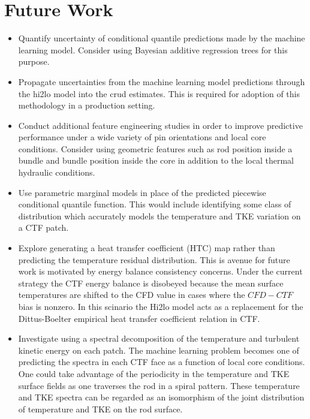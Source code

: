 \section{Future Work}

\begin{itemize}
    
    \item Quantify uncertainty of conditional quantile predictions made by the machine learning model.  Consider using Bayesian additive regression trees for this purpose.
    
    \item Propagate uncertainties from the machine learning model predictions through the hi2lo model into the crud estimates.  This is required for adoption of this methodology in a production setting.
    
    \item Conduct additional feature engineering studies in order to improve predictive performance under a wide variety of pin orientations and local core conditions.  Consider using geometric features such as rod position inside a bundle and bundle position inside the core in addition to the local thermal hydraulic conditions.
	
	\item Use parametric marginal models in place of the predicted piecewise conditional quantile function.  This would include identifying some class of distribution which accurately models the temperature and TKE variation on a CTF patch.
	
	\item Explore generating a heat transfer coefficient (HTC) map rather than predicting the temperature residual distribution.  This is avenue for future work is motivated by energy balance consistency concerns.  Under the current strategy the CTF energy balance is disobeyed because the mean surface temperatures are shifted to the CFD value in cases where the $CFD-CTF$ bias is nonzero.  In this scinario the Hi2lo model acts as a replacement for the Dittus-Boelter empirical heat transfer coefficient relation in CTF.
	
	\item Investigate using a spectral decomposition of the temperature and turbulent kinetic energy on each patch.  The machine learning problem becomes one of predicting the spectra in each CTF face as a function of local core conditions.  One could take advantage of the periodicity in the temperature and TKE surface fields as one traverses the rod in a spiral pattern.  These temperature and TKE spectra can be regarded as an isomorphism of the  joint distribution of temperature and TKE on the rod surface.
	

\end{itemize}
